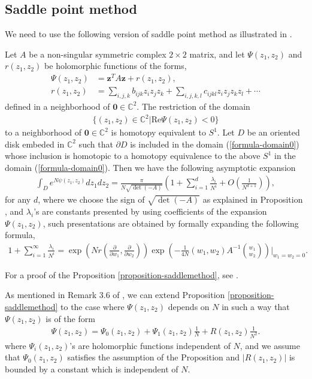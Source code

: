 \documentclass[12pt]{amsart}
\begin{document}
 \subsection{Saddle point method}
We need to use the following version of saddle point method as illustrated in \cite{Oht18}.
\begin{proposition}  \label{proposition-saddlemethod}
   Let $A$ be a non-singular symmetric complex $2\times 2$ matrix, and let $\Psi(z_1,z_2)$ and $r(z_1,z_2)$ be holomorphic functions of the forms, 
   \begin{align}
    \Psi(z_1,z_2)&=\mathbf{z}^{T}A\mathbf{z}+r(z_1,z_2), \\\nonumber
    r(z_1,z_2)&=\sum_{i,j,k}b_{ijk}z_iz_jz_k+\sum_{i,j,k,l}c_{ijkl}z_iz_jz_kz_l+\cdots
   \end{align}
   defined in a neighborhood of $\mathbf{0}\in \mathbb{C}^2$. The restriction of the domain 
   \begin{align} \label{formula-domain0}
       \{(z_1,z_2)\in \mathbb{C}^2| \text{Re} \Psi(z_1,z_2)<0\}  
   \end{align}
   to a neighborhood of $\mathbf{0}\in \mathbb{C}^2$ is homotopy equivalent to $S^1$. Let $D$ be an oriented disk embeded in $\mathbb{C}^2$ such that $\partial D$ is included in the domain (\ref{formula-domain0}) whose inclusion is homotopic to a homotopy equivalence to the above $S^1$ in the domain (\ref{formula-domain0}). Then we have the following asymptotic expansion
\begin{align}
    \int_{D}e^{N\psi(z_1,z_2)}dz_1dz_2=\frac{\pi}{N\sqrt{\det(-A)}}\left(1+\sum_{i=1}^d\frac{\lambda_i}{N^i}+O(\frac{1}{N^{d+1}})\right),
\end{align}
   for any $d$, where we choose the sign of $\sqrt{\det{(-A)}}$ as explained in Proposition \cite{Oht16}, and $\lambda_i$'s are constants presented by using coefficients of the expansion $\Psi(z_1,z_2)$, such presentations are obtained by formally expanding the following formula, 
\begin{align}
    1+\sum_{i=1}^{\infty}\frac{\lambda_i}{N^i}=\exp\left(Nr\left(\frac{\partial }{\partial w_1},\frac{\partial }{\partial w_2}\right)\right)\exp\left(-\frac{1}{4N}(w_1,w_2)A^{-1}\binom{w_1}{w_2}\right)|_{w_1=w_2=0}.
\end{align}
\end{proposition}
For a proof of the Proposition \ref{proposition-saddlemethod},  see \cite{Oht16}. 
\begin{remark}  \label{remark-saddle}
    As mentioned in Remark 3.6 of \cite{Oht16}, we can extend Proposition \ref{proposition-saddlemethod} to the case where $\Psi(z_1,z_2)$ depends on $N$ in such a way that $\Psi(z_1,z_2)$ is of the form 
    \begin{align}
        \Psi(z_1,z_2)=\Psi_0(z_1,z_2)+\Psi_1(z_1,z_2)\frac{1}{N}+R(z_1,z_2)\frac{1}{N^2}. 
    \end{align}
    where $\Psi_i(z_1,z_2)$'s are holomorphic functions independent of $N$, and we assume that $\Psi_0(z_1,z_2)$ satisfies the assumption of the Proposition and $|R(z_1,z_2)|$ is bounded by a constant which is independent of $N$.  
\end{remark}
\end{document}
